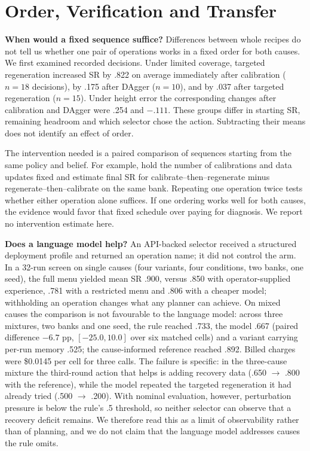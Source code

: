 \clearpage
\section{Order, Verification and Transfer}
\textbf{When would a fixed sequence suffice?} Differences between whole recipes do not tell us whether one pair of operations works in a fixed order for both causes. We first examined recorded decisions. Under limited coverage, targeted regeneration increased SR by .822 on average immediately after calibration ($n=18$ decisions), by .175 after DAgger ($n=10$), and by .037 after targeted regeneration ($n=15$). Under height error the corresponding changes after calibration and DAgger were .254 and $-.111$. These groups differ in starting SR, remaining headroom and which selector chose the action. Subtracting their means does not identify an effect of order.

The intervention needed is a paired comparison of sequences starting from the same policy and belief. For example, hold the number of calibrations and data updates fixed and estimate final SR for calibrate--then--regenerate minus regenerate--then--calibrate on the same bank. Repeating one operation twice tests whether either operation alone suffices. If one ordering works well for both causes, the evidence would favor that fixed schedule over paying for diagnosis. We report no intervention estimate here.

\textbf{Does a language model help?} An API-backed selector received a structured deployment profile and returned an operation name; it did not control the arm. In a 32-run screen on single causes (four variants, four conditions, two banks, one seed), the full menu yielded mean SR .900, versus .850 with operator-supplied experience, .781 with a restricted menu and .806 with a cheaper model; withholding an operation changes what any planner can achieve. On mixed causes the comparison is not favourable to the language model: across three mixtures, two banks and one seed, the rule reached .733, the model .667 (paired difference $-6.7$ pp, $[-25.0,10.0]$ over six matched cells) and a variant carrying per-run memory .525; the cause-informed reference reached .892. Billed charges were \$0.0145 per cell for three calls. The failure is specific: in the three-cause mixture the third-round action that helps is adding recovery data (.650 $\rightarrow$ .800 with the reference), while the model repeated the targeted regeneration it had already tried (.500 $\rightarrow$ .200). With nominal evaluation, however, perturbation pressure is below the rule's .5 threshold, so neither selector can observe that a recovery deficit remains. We therefore read this as a limit of observability rather than of planning, and we do not claim that the language model addresses causes the rule omits.

